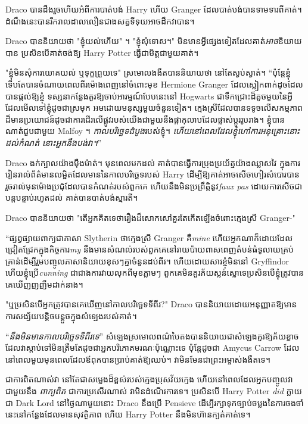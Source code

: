 {{Draco បានដឹងរួចហើយអំពីការបាត់បង់ Harry ហើយ Granger ដែលបាត់បង់បានទាមទារពីគាត់។ ដំណឹងនេះបានរីករាលដាលលឿនជាងសត្វទីទុយអាចដឹកវាបាន។

Draco បាននិយាយថា "ខ្ញុំយល់ហើយ" ។ "ខ្ញុំសុំទោស។" មិនមានអ្វីផ្សេងទៀតដែលគាត់\emph{អាច}និយាយបាន ប្រសិនបើគាត់ចង់ឱ្យ Harry Potter ធ្វើជាមិត្តជាមួយគាត់។

"ខ្ញុំមិនសុំការយោគយល់ ឬទុក្ខព្រួយទេ" ស្រមោលងងឹតបាននិយាយថា នៅតែស្ងប់ស្ងាត់។ “ប៉ុន្តែខ្ញុំទើបតែបានចំណាយពេលពីរម៉ោងពេញនៅចំពោះមុខ Hermione Granger ដែលស្លៀកពាក់ដូចដែលបានផ្តល់ឱ្យខ្ញុំ ទស្សនាកន្លែងគួរឱ្យចាប់អារម្មណ៍បែបនេះនៅ Hogwarts ជាទឹកជ្រោះដ៏តូចមួយនៃអ្វីដែលមើលទៅខ្ញុំដូចជាស្រមុក អមដោយមនុស្សមួយចំនួនទៀត។ ក្មេងស្រីដែលបានទទូចលើសកម្មភាពដ៏មានប្រយោជន៍ដូចជាការដើរលើផ្លូវរបស់យើងជាមួយនឹងផ្កាកុលាបដែលផ្លាស់ប្តូររូបរាង។ ខ្ញុំបានណាត់ជួបជាមួយ Malfoy ។ \emph{កាលបរិច្ឆេទដំបូង}របស់ខ្ញុំ។ \emph{ហើយ​នៅ​ពេល​ដែល​ខ្ញុំ​ហៅ​ការ​អនុគ្រោះ​នោះ​ដល់​កំណត់ នោះ​អ្នក​នឹង​បង់​វា។}”

Draco ងក់ក្បាលយ៉ាងម៉ឺងម៉ាត់។ មុនពេលមកដល់ គាត់បានធ្វើការប្រុងប្រយ័ត្នយ៉ាងឈ្លាសវៃ ក្នុងការរៀនរាល់ព័ត៌មានលម្អិតដែលមាននៃកាលបរិច្ឆេទរបស់ Harry ដើម្បីឱ្យគាត់អាចសើចហៀរសំបោរបានរួចរាល់មុនម៉ោងប្រជុំដែលបានកំណត់របស់ពួកគេ ហើយនឹងមិនប្រព្រឹត្តិនូវ\emph{faux pas} ដោយការសើចជាបន្តបន្ទាប់រហូតដល់ គាត់បានបាត់បង់ស្មារតី។

Draco បាននិយាយថា "តើអ្នកគិតទេថារឿងដ៏សោកសៅគួរតែកើតឡើងចំពោះក្មេងស្រី Granger-"

“ផ្សព្វផ្សាយពាក្យជាភាសា Slytherin ថាក្មេងស្រី Granger គឺ\emph{mine} ហើយអ្នកណាក៏ដោយដែលជ្រៀតជ្រែកក្នុងកិច្ចការ\emph{my} នឹងមានសំណល់របស់ពួកគេនៅរាយប៉ាយពាសពេញតំបន់ធំទូលាយគ្រប់គ្រាន់ដើម្បីរួមបញ្ចូលភាសានិយាយខុសៗគ្នាចំនួនដប់ពីរ។ ហើយដោយសារខ្ញុំមិននៅ Gryffindor ហើយខ្ញុំប្រើ\emph{cunning} ជាជាងការវាយលុកពីមុខភ្លាមៗ ពួកគេមិនគួរភ័យស្លន់ស្លោទេប្រសិនបើខ្ញុំត្រូវបានគេឃើញញញឹមដាក់នាង។

"ឬប្រសិនបើអ្នកត្រូវបានគេឃើញនៅកាលបរិច្ឆេទទីពីរ?" Draco បាន​និយាយ​ដោយ​អនុញ្ញាត​ឱ្យ​មាន​ការ​សង្ស័យ​បន្តិច​បន្តួច​ក្នុង​សំឡេង​របស់​គាត់។

“\emph{នឹងមិនមានកាលបរិច្ឆេទទីពីរទេ}” សំឡេងស្រមោលពណ៌បៃតងបាននិយាយជាសំឡេងគួរឱ្យភ័យខ្លាចដែលវាស្តាប់ទៅមិនត្រឹមតែដូចជាអ្នកបរិភោគមរណៈប៉ុណ្ណោះទេ ប៉ុន្តែដូចជា Amycus Carrow ដែលនៅពេលមួយមុនពេលដែលឪពុកបានប្រាប់គាត់ឱ្យឈប់។ វាមិនមែនជាព្រះអម្ចាស់ងងឹតទេ។

ជាការពិតណាស់វា \emph{} នៅតែជាសម្លេងដ៏ខ្ពស់របស់ក្មេងប្រុសវ័យក្មេង ហើយនៅពេលដែលអ្នកបញ្ចូលវាជាមួយនឹង \emph{ពាក្យពិត} ជាការប្រសើរណាស់ វាមិនដំណើរការទេ។ ប្រសិនបើ Harry Potter \emph{did} ក្លាយជា Dark Lord នៅថ្ងៃណាមួយនោះ Draco នឹងប្រើ Pensieve ដើម្បីរក្សាទុកច្បាប់ចម្លងនៃការចងចាំនេះនៅកន្លែងដែលមានសុវត្ថិភាព ហើយ Harry Potter នឹងមិនហ៊ានក្បត់គាត់ទេ។

}}

